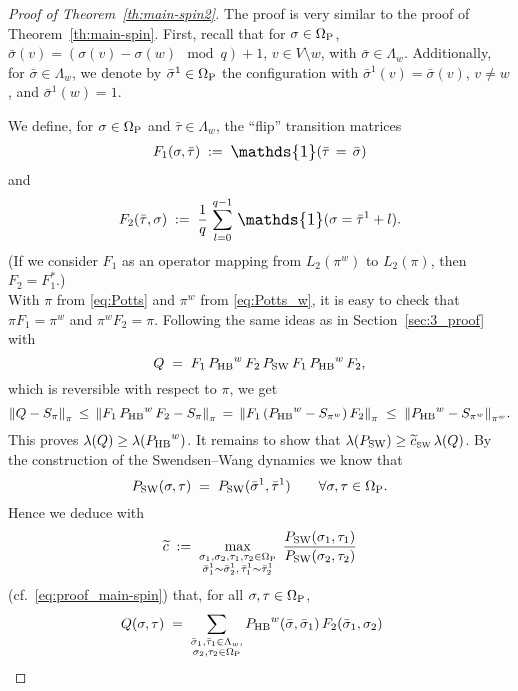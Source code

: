 \documentclass{dis}
\theoremstyle{citing}
\begin{document}
\begin{proof}[Proof of Theorem~\ref{th:main-spin2}]
The proof is very similar to the proof of 
Theorem~\ref{th:main-spin}.
First, recall that for $\sigma\in{{\Omega}_{\rm P}}$, 
$\bar\sigma(v)=(\sigma(v)-\sigma(w)\mod q)+1$, $v\in V\setminus w$, 
with $\bar\sigma\in\Lambda_w$. 
Additionally, for $\bar\sigma\in\Lambda_w$, we denote by 
$\bar\sigma^1\in{{\Omega}_{\rm P}}$ the configuration with 
$\bar\sigma^1(v)=\bar\sigma(v)$, $v\neq w$, and $\bar\sigma^1(w)=1$.

We define, for $\sigma\in{\Omega}_{\rm P}$ and 
$\bar\tau\in\Lambda_w$, the ``flip'' 
transition matrices 
\[
F_1(\sigma,\bar\tau) \;:=\; {\scalebox{1.2}{\raisebox{-0.2mm}{$\mathds{1}$}}}(\bar\tau\,=\,\bar\sigma)
\]
and
\[
F_2(\bar\tau,\sigma) \;:=\; 
\frac{1}{q}\,\sum_{l=0}^{q-1}\,{\scalebox{1.2}{\raisebox{-0.2mm}{$\mathds{1}$}}}(\sigma=\bar\tau^1+l).
\]
(If we consider $F_1$ as an operator mapping from $L_2(\pi^w)$ 
to $L_2(\pi)$, then $F_2=F_1^*$.)\\
With $\pi$ from \eqref{eq:Potts} and $\pi^w$ from \eqref{eq:Potts_w}, 
it is easy to check that $\pi F_1=\pi^w$ and 
$\pi^w F_2=\pi$.
Following the same ideas as in Section~\ref{sec:3_proof}
with
\[
Q \;=\; F_1\,{P_{\rm HB}}^w\,F_2\,{P_{\rm SW}}\,
	F_1\,{P_{\rm HB}}^w\,F_2,
\]
which is reversible with respect to $\pi$, we get 
\[
{\left\Vert { Q-S_\pi} \right\Vert}_\pi \,\le\, 
{\left\Vert { F_1\,{P_{\rm HB}}^w\,F_2-S_{\pi}} \right\Vert}_{\pi}
\,=\, {\left\Vert { F_1\,({P_{\rm HB}}^w-S_{\pi^w})\,F_2} \right\Vert}_{\pi}
\;\le\; {\left\Vert {{P_{\rm HB}}^{w}-S_{\pi^w}} \right\Vert}_{\pi^w}.
\]
This proves $\lambda(Q)\ge\lambda({P_{\rm HB}}^w)$. 
It remains to show that $\lambda({P_{\rm SW}})\ge{\widetilde{c}_{\text{\rm\tiny SW}}}\,\lambda(Q)$. 
By the construction of the Swendsen--Wang dynamics we know that 
\[
{P_{\rm SW}}(\sigma,\tau) \;=\; {P_{\rm SW}}(\bar\sigma^1,\bar\tau^1)\qquad 
	\forall\sigma,\tau\in{\Omega}_{\rm P}.
\]
Hence we deduce with 
\[
\widetilde{c} \;:=\; 
\max_{\substack{\sigma_1,\sigma_2,\tau_1,\tau_2\in{{\Omega}_{\rm P}}\\ 
\bar\sigma_1^1\sim \bar\sigma_2^1,\,\bar\tau_1^1\sim \bar\tau_2^1}}\;
\frac{{P_{\rm SW}}(\sigma_1,\tau_1)}{{P_{\rm SW}}(\sigma_2,\tau_2)}
\]
(cf.~\eqref{eq:proof_main-spin}) 
that, for all $\sigma,\tau\in{{\Omega}_{\rm P}}$, 
\[\begin{split}
Q(\sigma,\tau) 
\;&=\; \sum_{\substack{\bar\sigma_1,\bar\tau_1\in\Lambda_w,\\
								\sigma_2,\tau_2\in{{\Omega}_{\rm P}}}}
	{P_{\rm HB}}^w(\bar\sigma,\bar\sigma_1)\,F_2(\bar\sigma_1,\sigma_2)\,

\end{split}\]
\end{proof}
\end{document}

